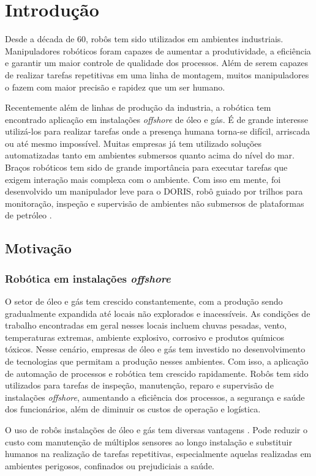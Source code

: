 	\chapter{Introdução}

Desde a década de 60, robôs tem sido utilizados em ambientes industriais. Manipuladores robóticos foram capazes de aumentar a produtividade, a eficiência e garantir um maior controle de qualidade dos processos. Além de serem capazes de realizar tarefas repetitivas em uma linha de montagem, muitos manipuladores o fazem com maior precisão e rapidez que um ser humano. 

Recentemente além de linhas de produção da industria, a robótica tem encontrado aplicação em instalações \textit{offshore} de óleo e gás. É de grande interesse utilizá-los para realizar tarefas onde a presença humana torna-se difícil, arriscada ou até mesmo impossível. Muitas empresas já tem utilizado soluções automatizadas tanto em ambientes submersos quanto acima do nível do mar. Braços robóticos tem sido de grande importância para executar tarefas que exigem interação mais complexa com o ambiente. Com isso em mente, foi desenvolvido um manipulador leve para o DORIS, robô guiado por trilhos para monitoração, inspeção e supervisão de ambientes não submersos de plataformas de petróleo \citep{xaud2016doris}.

\section{Motivação}
\subsection{Robótica em instalações \textit{offshore}}
O setor de óleo e gás tem crescido constantemente, com a produção sendo gradualmente expandida até locais não explorados e inacessíveis. As condições de trabalho encontradas em geral nesses locais incluem chuvas pesadas, vento, temperaturas extremas, ambiente explosivo, corrosivo e produtos químicos tóxicos. Nesse cenário, empresas de óleo e gás tem investido no desenvolvimento de tecnologias que permitam a produção nesses ambientes. Com isso, a aplicação de automação de processos e robótica tem crescido rapidamente. Robôs tem sido utilizados para tarefas de inspeção, manutenção, reparo e supervisão de instalações \textit{offshore}, aumentando a eficiência dos processos, a segurança e saúde dos funcionários, além de diminuir os custos de operação e logística.  

O uso de robôs instalações de óleo e gás tem diversas vantagens \citep{skourup2009robotized}. Pode reduzir o custo com manutenção de múltiplos sensores ao longo instalação e substituir humanos na realização de tarefas repetitivas, especialmente aquelas realizadas em ambientes perigosos, confinados ou prejudiciais a saúde. 

